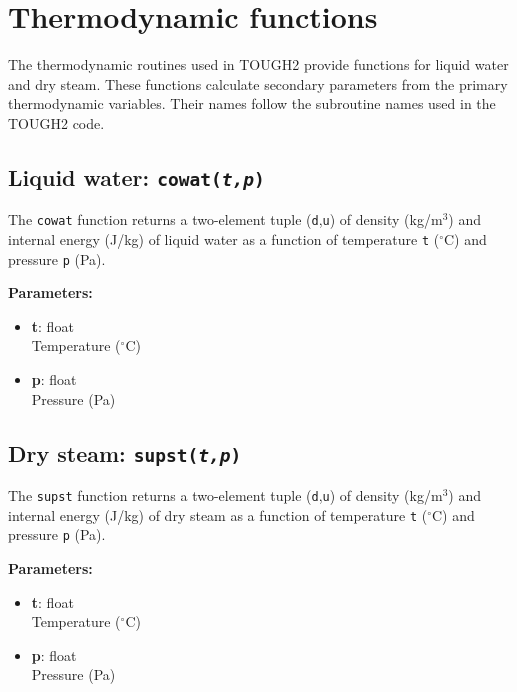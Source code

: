 \section{Thermodynamic functions}

The thermodynamic routines used in TOUGH2 provide functions for liquid water and dry steam.  These functions calculate secondary parameters from the primary thermodynamic variables.  Their names follow the subroutine names used in the TOUGH2 code.

\begin{snugshade}
\subsection{Liquid water: \texttt{cowat(\emph{t,p})}}
\end{snugshade}
\label{sec:t2thermo:cowat}

The \texttt{cowat} function returns a two-element tuple (\texttt{d},\texttt{u}) of density (kg/m$^3$) and internal energy (J/kg) of liquid water as a function of temperature \texttt{t} ($^{\circ}$C) and pressure \texttt{p} (Pa).

\textbf{Parameters:}
\begin{itemize}
\item \textbf{t}: float\\
  Temperature ($^{\circ}$C)
\item \textbf{p}: float\\
  Pressure (Pa)
\end{itemize}

\begin{snugshade}
\subsection{Dry steam: \texttt{supst(\emph{t,p})}}
\end{snugshade}
\label{sec:t2thermo:supst}

The \texttt{supst} function returns a two-element tuple (\texttt{d},\texttt{u}) of density (kg/m$^3$) and internal energy (J/kg) of dry steam as a function of temperature \texttt{t} ($^{\circ}$C) and pressure \texttt{p} (Pa).

\textbf{Parameters:}
\begin{itemize}
\item \textbf{t}: float\\
  Temperature ($^{\circ}$C)
\item \textbf{p}: float\\
  Pressure (Pa)
\end{itemize}


